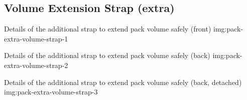 \subsection{Volume Extension Strap (extra)}

{Details of the additional strap to extend pack volume safely (front)}
{img:pack-extra-volume-strap-1}

{Details of the additional strap to extend pack volume safely (back)}
{img:pack-extra-volume-strap-2}

{Details of the additional strap to extend pack volume safely (back, detached)}
{img:pack-extra-volume-strap-3}
